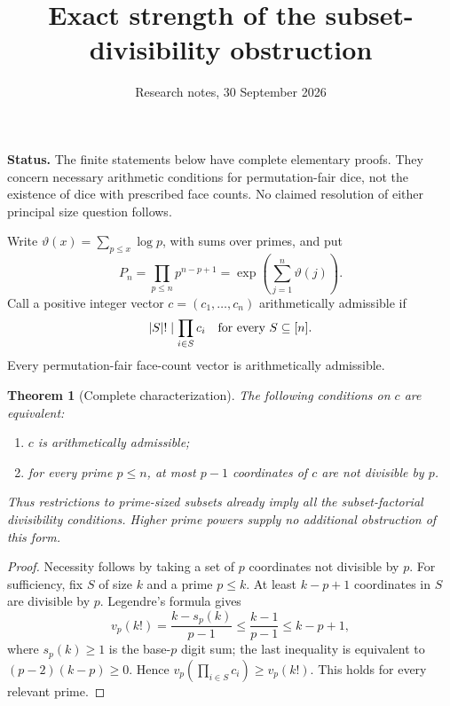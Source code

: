 \documentclass[11pt]{article}
\title{Exact strength of the subset-divisibility obstruction}
\author{Research notes, 30 September 2026}
\date{}
\newtheorem{theorem}{Theorem}
\begin{document}
\maketitle
\noindent\textbf{Status.} The finite statements below have complete elementary proofs.
They concern necessary arithmetic conditions for permutation-fair dice, not
the existence of dice with prescribed face counts. No claimed resolution
of either principal size question follows.

Write $\vartheta(x)=\sum_{p\le x}\log p$, with sums over primes, and put
\[
 P_n=\prod_{p\le n}p^{n-p+1}
     =\exp\left(\sum_{j=1}^n\vartheta(j)\right).
\]
Call a positive integer vector $c=(c_1,\ldots,c_n)$ arithmetically admissible
if
\[
 |S|!\mid\prod_{i\in S}c_i\quad\hbox{for every }S\subseteq[n].
\]
Every permutation-fair face-count vector is arithmetically admissible.

\begin{theorem}[Complete characterization]
The following conditions on $c$ are equivalent:
\begin{enumerate}
\item $c$ is arithmetically admissible;
\item for every prime $p\le n$, at most $p-1$ coordinates of $c$ are not
divisible by $p$.
\end{enumerate}
Thus restrictions to prime-sized subsets already imply all the
subset-factorial divisibility conditions. Higher prime powers supply no
additional obstruction of this form.
\end{theorem}
\begin{proof}
Necessity follows by taking a set of $p$ coordinates not divisible by $p$.
For sufficiency, fix $S$ of size $k$ and a prime $p\le k$. At least
$k-p+1$ coordinates in $S$ are divisible by $p$. Legendre's formula gives
\[
 v_p(k!)=\frac{k-s_p(k)}{p-1}\le\frac{k-1}{p-1}\le k-p+1,
\]
where $s_p(k)\ge1$ is the base-$p$ digit sum; the last inequality is
equivalent to $(p-2)(k-p)\ge0$. Hence
$v_p(\prod_{i\in S}c_i)\ge v_p(k!)$. This holds for every relevant prime.
\end{proof}
\end{document}
